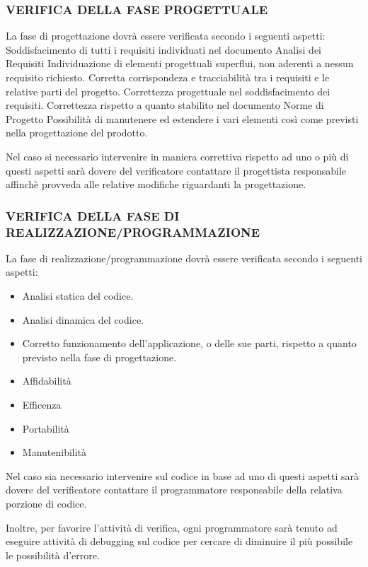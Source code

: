 \subsubsection*{VERIFICA DELLA FASE PROGETTUALE}

La fase di progettazione dovr\`a essere verificata secondo i seguenti aspetti:
Soddisfacimento di tutti i requisiti individuati nel documento Analisi dei Requisiti
Individuazione di elementi progettuali superflui, non aderenti a nessun requisito richiesto.
Corretta corrispondeza e tracciabilit\`a tra i requisiti e le relative parti del progetto.
Correttezza progettuale nel soddisfacimento dei requisiti.
Correttezza rispetto a quanto stabilito nel documento Norme di Progetto
Possibilit\`a di manutenere ed estendere i vari elementi cos\`i come previsti nella progettazione del prodotto.


Nel caso si necessario intervenire in maniera correttiva rispetto ad uno o pi\`u di questi aspetti sar\`a dovere del verificatore contattare il progettista responsabile affinch\`e provveda alle relative modifiche riguardanti la progettazione.

\subsubsection*{VERIFICA DELLA FASE DI REALIZZAZIONE/PROGRAMMAZIONE}

La fase di realizzazione/programmazione dovr\`a essere verificata secondo i seguenti aspetti:
\begin{itemize}
\item Analisi statica del codice.
\item Analisi dinamica del codice.
\item Corretto funzionamento dell'applicazione, o delle sue parti, rispetto a
quanto previsto nella fase di progettazione.
\item Affidabilit\`a
\item Efficenza
\item Portabilit\`a
\item Manutenibilit\`a
\end{itemize}

Nel caso sia necessario intervenire sul codice in base ad uno di questi aspetti
sar\`a dovere del verificatore contattare il programmatore responsabile della
relativa porzione di codice.

Inoltre, per favorire l'attivit\`a di verifica, ogni programmatore sar\`a tenuto
ad eseguire attivit\`a di debugging sul codice per cercare di diminuire il pi\`u
possibile le possibilit\`a d'errore.

